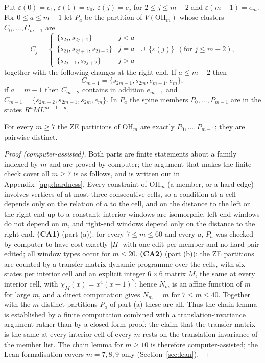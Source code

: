  Put $\varepsilon(0)=e_1$, $\varepsilon(1)=e_0$, $\varepsilon(j)=e_j$ for $2\le j\le m-2$ and $\varepsilon(m-1)=e_m$. For $0\le a\le m-1$ let $P_a$ be the partition of $V(\mathrm{OH}_m)$ whose clusters $C_0,\dots,C_{m-1}$ are
\[
C_j=\begin{cases}\{s_{2j},s_{2j+1}\}&j<a\\ \{s_{2j},s_{2j+1},s_{2j+2}\}&j=a\\ \{s_{2j+1},s_{2j+2}\}&j>a\end{cases}\ \cup\ \{\varepsilon(j)\}\ \ (\text{for }j\le m-2),
\]
together with the following changes at the right end. If $a\le m-2$ then
\[C_{m-1}=\{s_{2m-1},\allowbreak s_{2m},\allowbreak e_{m-1},\allowbreak e_m\};\]
if $a=m-1$ then $C_{m-2}$ contains in addition $e_{m-1}$ and $C_{m-1}=\{s_{2m-2},\allowbreak s_{2m-1},\allowbreak s_{2m},\allowbreak e_m\}$. In $P_a$ the spine members $P_0,\dots,P_{m-1}$ are in the states $R^{a}ML^{m-1-a}$.

\begin{lemma}\label{lem:hchain}
For every $m\ge7$ the ZE partitions of $\mathrm{OH}_m$ are exactly $P_0,\dots,P_{m-1}$; they are pairwise distinct.
\end{lemma}
\begin{proof}[Proof (computer-assisted)]
Both parts are finite statements about a family indexed by $m$ and are proved by computer; the argument that makes the finite check cover all $m\ge7$ is as follows, and is written out in Appendix~\ref{app:hardness}. Every constraint of $\mathrm{OH}_m$ (a member, or a hard edge) involves vertices of at most three consecutive cells, so a condition at a cell depends only on the relation of $a$ to the cell, and on the distance to the left or the right end up to a constant; interior windows are isomorphic, left-end windows do not depend on $m$, and right-end windows depend only on the distance to the right end. \textbf{(CA1)} (part (a)): for every $7\le m\le60$ and every $a$, $P_a$ was checked by computer to have cost exactly $|H|$ with one edit per member and no hard pair edited; all window types occur for $m\le20$. \textbf{(CA2)} (part (b)): the ZE partitions are counted by a transfer-matrix dynamic programme over the cells, with six states per interior cell and an explicit integer $6\times6$ matrix $M$, the same at every interior cell, with $\chi_M(x)=x^4(x-1)^2$; hence $N_m$ is an affine function of $m$ for large $m$, and a direct computation gives $N_m=m$ for $7\le m\le40$. Together with the $m$ distinct partitions $P_a$ of part (a) these are all. Thus the chain lemma is established by a finite computation combined with a translation-invariance argument rather than by a closed-form proof: the claim that the transfer matrix is the same at every interior cell of every $m$ rests on the translation invariance of the member list. The chain lemma for $m\ge10$ is therefore computer-assisted; the Lean formalisation covers $m=7,8,9$ only (Section~\ref{sec:lean}).
\end{proof}

